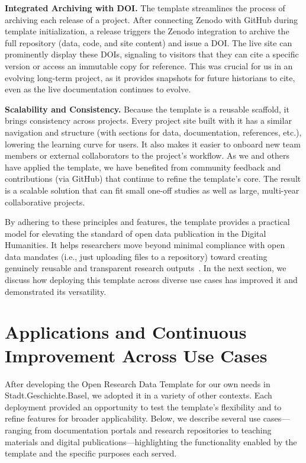 \documentclass[final]{anthology-ch} %
\begin{document}
\noindent
\textbf{Integrated Archiving with DOI.} The template streamlines the process of archiving each release of a project. After connecting Zenodo with GitHub during template initialization, a release triggers the Zenodo integration to archive the full repository (data, code, and site content) and issue a DOI. The live site can prominently display these DOIs, signaling to visitors that they can cite a specific version or access an immutable copy for reference. This was crucial for us in an evolving long-term project, as it provides snapshots for future historians to cite, even as the live documentation continues to evolve.



\noindent
\textbf{Scalability and Consistency.} Because the template is a reusable scaffold, it brings consistency across projects. Every project site built with it has a similar navigation and structure (with sections for data, documentation, references, etc.), lowering the learning curve for users. It also makes it easier to onboard new team members or external collaborators to the project's workflow. As we and others have applied the template, we have benefited from community feedback and contributions (via GitHub) that continue to refine the template's core. The result is a scalable solution that can fit small one-off studies as well as large, multi-year collaborative projects.

\noindent\newline
By adhering to these principles and features, the template provides a practical model for elevating the standard of open data publication in the Digital Humanities. It helps researchers move beyond minimal compliance with open data mandates (i.e., just uploading files to a repository) toward creating genuinely reusable and transparent research outputs~\cite{diekjobst2024a}. In the next section, we discuss how deploying this template across diverse use cases has improved it and demonstrated its versatility.

\section{Applications and Continuous Improvement Across Use Cases}\label{applications-and-continuous-improvement-across-use-cases}

After developing the Open Research Data Template for our own needs in Stadt.Geschichte.Basel, we adopted it in a variety of other contexts. Each deployment provided an opportunity to test the template's flexibility and to refine features for broader applicability. Below, we describe several use cases---ranging from documentation portals and research repositories to teaching materials and digital publications---highlighting the functionality enabled by the template and the specific purposes each served.
\end{document}
